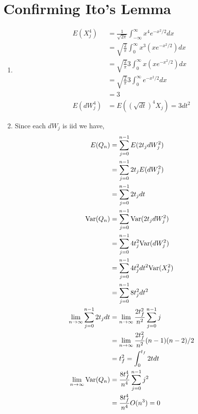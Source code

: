 \documentclass{article}
\begin{document}
\section{Confirming Ito's Lemma}
    \begin{enumerate}[label=\roman*)]
        \item 
        \begin{align*}
            E(X_j^4) &=\frac{1}{\sqrt{2\pi}} \int_{-\infty}^{\infty} x^4e^{-x^2/2}dx
            \\
            &= \sqrt{\frac{2}{\pi}} \int_{0}^{\infty}
            x^3\left(xe^{-x^2/2}\right)dx\\
            &=  \sqrt{\frac{2}{\pi}} 3\int_{0}^{\infty}
            x\left(xe^{-x^2/2}\right)dx\\
            &= \sqrt{\frac{2}{\pi}} 3\int_{0}^{\infty}
            e^{-x^2/2}dx\\
            &= 3
            \\
            E(dW_j^4) &= E((\sqrt{dt})^4X_j) = 3dt^2
        \end{align*}
        \item Since each $dW_j$ is iid we have,
        \begin{align*}
            E(Q_n) &= \sum_{j=0}^{n-1} E(2t_jdW_j^2)\\
            &= \sum_{j=0}^{n-1} 2t_jE(dW_j^2) 
            \\
            &= \sum_{j=0}^{n-1} 2t_jdt
            \\
            \text{Var}(Q_n) &=\sum_{j=0}^{n-1} \text{Var}(2t_jdW_j^2) \\
            &=   \sum_{j=0}^{n-1} 4t_j^2\text{Var}(dW_j^2)
            \\
            &=   \sum_{j=0}^{n-1} 4t_j^2dt^2\text{Var}(X_j^2)
            \\
            &=   \sum_{j=0}^{n-1} 8t_j^2dt^2
            \\
            \lim_{n\to\infty}\sum_{j=0}^{n-1} 2t_jdt &=
            \lim_{n\to\infty}\frac{2t_f^2}{n^2}\sum_{j=0}^{n-1} j
            \\
            &= \lim_{n\to\infty}\frac{2t_f^2}{n^2}(n-1)(n-2)/2
            \\
            &= t_f^2 = \int_0^{t_f} 2tdt
            \\
            \lim_{n\to\infty}\text{Var}(Q_n) &=  \frac{8t_f^4}{n^4}\sum_{j=0}^{n-1} j^2 
            \\
            &= \frac{8t_f^4}{n^4}O(n^3) = 0 
        \end{align*}
    \end{enumerate}
\end{document}
